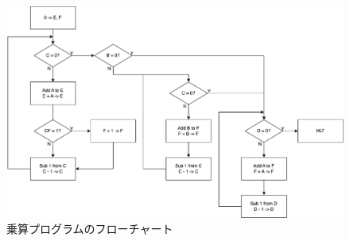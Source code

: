 \documentclass[dvipdfmx]{jsarticle}
\begin{document}
\begin{figure}[H]
    \begin{center}
    \includegraphics[scale=0.5]{img/flow.eps}%
    \end{center}
    \vspace{-3mm}
    \caption{乗算プログラムのフローチャート}
    \label{img:flow}
\end{figure}
\end{document}
